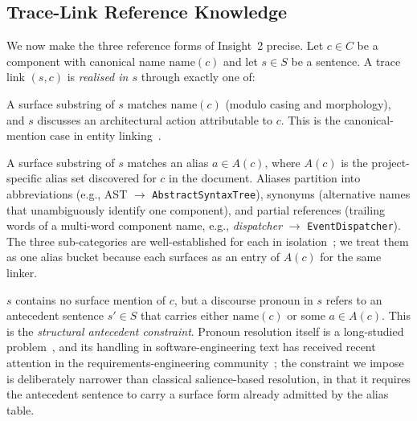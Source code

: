\subsection{Trace-Link Reference Knowledge}\label{sec:refknowledge}

We now make the three reference forms of Insight~2 precise.
Let $c \in C$ be a component with canonical name $\mathrm{name}(c)$ and let $s \in S$ be a sentence.
A trace link $(s, c)$ is \emph{realised in $s$} through exactly one of:

\begin{description}[leftmargin=*,style=nextline]
  \item[\emph{Explicit mention.}] A surface substring of $s$ matches $\mathrm{name}(c)$ (modulo casing and morphology), and $s$ discusses an architectural action attributable to $c$.
  This is the canonical-mention case in entity linking~\cite{mihalcea2007wikify,cucerzan2007large,hachey2013evaluating}.
  \item[\emph{Entity alias.}] A surface substring of $s$ matches an alias $a \in A(c)$, where $A(c)$ is the project-specific alias set discovered for $c$ in the document.
  Aliases partition into abbreviations (e.g., AST $\to$ \texttt{AbstractSyntaxTree}), synonyms (alternative names that unambiguously identify one component), and partial references (trailing words of a multi-word component name, e.g., \emph{dispatcher} $\to$ \texttt{EventDispatcher}).
  The three sub-categories are well-established for each in isolation~\cite{schwartz2003simple,bunescu2006using,lawrie2011expanding,howard2013automatically,falleri2010automatic}; we treat them as one alias bucket because each surfaces as an entry of $A(c)$ for the same linker.
  \item[\emph{Pronominal reference.}] $s$ contains no surface mention of $c$, but a discourse pronoun in $s$ refers to an antecedent sentence $s' \in S$ that carries either $\mathrm{name}(c)$ or some $a \in A(c)$.
  This is the \emph{structural antecedent constraint}.
  Pronoun resolution itself is a long-studied problem~\cite{hobbs1978resolving,lappin1994algorithm,grosz1995centering,mitkov1998robust,soon2001machine}, and its handling in software-engineering text has received recent attention in the requirements-engineering community~\cite{yang2011analysing,ezzini2022automated}; the constraint we impose is deliberately narrower than classical salience-based resolution, in that it requires the antecedent sentence to carry a surface form already admitted by the alias table.
\end{description}

